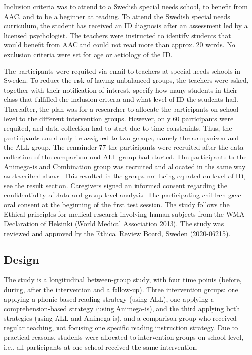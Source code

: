 \documentclass[
]{article}
\begin{document}
Inclusion criteria was to attend to a Swedish special needs school, to
benefit from AAC, and to be a beginner at reading. To attend the Swedish
special needs curriculum, the student has received an ID diagnosis after
an assessment led by a licensed psychologist. The teachers were
instructed to identify students that would benefit from AAC and could
not read more than approx. 20 words. No exclusion criteria were set for
age or aetiology of the ID.

The participants were requited via email to teachers at special needs
schools in Sweden. To reduce the risk of having unbalanced groups, the
teachers were asked, together with their notification of interest,
specify how many students in their class that fulfilled the inclusion
criteria and what level of ID the students had. Thereafter, the plan was
for a researcher to allocate the participants on school level to the
different intervention groups. However, only 60 participants were
requited, and data collection had to start due to time constraints.
Thus, the participants could only be assigned to two groups, namely the
comparison and the ALL group. The remainder 77 the participants were
recruited after the data collection of the comparison and ALL group had
started. The participants to the Animega-is and Combination group was
recruited and allocated in the same way as described above. This
resulted in the groups not being equated on level of ID, see the result
section. Caregivers signed an informed consent regarding the
confidentiality of data and group-level analysis. The participating
children gave oral consent at the beginning of the first test session.
The study follows the Ethical principles for medical research involving
human subjects from the WMA Declaration of Helsinki (World Medical
Association 2013). The study was reviewed and approved by the Ethical
Review Board, Sweden (2020-06215).

\hypertarget{design}{%
\subsection{Design}\label{design}}

The study is a longitudinal between-group study, with four time points
(before, during, after the intervention and a follow-up). Three
intervention groups: one applying a phonic-based reading strategy (using
ALL), one applying a comprehension-based strategy (using Animega-is),
and the third applying both strategies (using ALL and Animega-is), and a
comparison group who received regular teaching, not focusing one
specific reading instruction strategy. Due to practical reasons,
students were allocated to intervention groups on school-level, i.e.,
all participants at one school received the same intervention.
\end{document}

